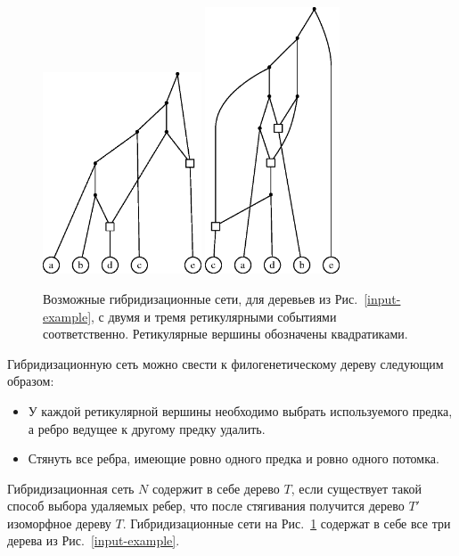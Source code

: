 \begin{figure}[t]
  \centering
  \includegraphics[width=4.7cm]{img/ans.eps}
  \hspace{1cm}
  \includegraphics[width=4cm]{img/ans3.eps}
  \caption{Возможные гибридизационные сети, для деревьев из Рис.~\ref{input-example}, с двумя и тремя ретикулярными событиями соответственно. Ретикулярные вершины обозначены квадратиками.}
  \label{network-example}
\end{figure}

Гибридизационную сеть можно свести к филогенетическому дереву следующим образом:

\begin{itemize}
	\item У каждой ретикулярной вершины необходимо выбрать используемого предка, а ребро ведущее к другому предку удалить.
	\item Стянуть все ребра, имеющие ровно одного предка и ровно одного потомка.
\end{itemize}

Гибридизационная сеть $N$ содержит в себе дерево $T$, если существует такой способ выбора удаляемых ребер, что после стягивания получится дерево $T'$ изоморфное дереву $T$.
Гибридизационные сети на Рис.~\ref{network-example} содержат в себе все три дерева из Рис.~\ref{input-example}.

